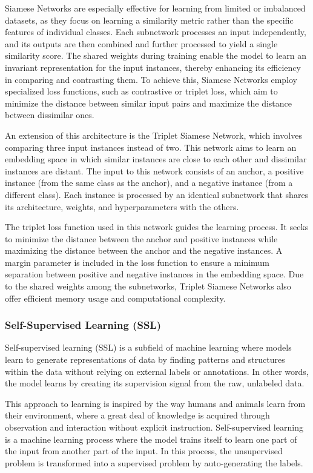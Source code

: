 Siamese Networks are especially effective for learning from limited or imbalanced datasets, as they focus on learning a similarity metric rather than the specific features of individual classes. Each subnetwork processes an input independently, and its outputs are then combined and further processed to yield a single similarity score. The shared weights during training enable the model to learn an invariant representation for the input instances, thereby enhancing its efficiency in comparing and contrasting them. To achieve this, Siamese Networks employ specialized loss functions, such as contrastive or triplet loss, which aim to minimize the distance between similar input pairs and maximize the distance between dissimilar ones.

An extension of this architecture is the Triplet Siamese Network, which involves comparing three input instances instead of two. This network aims to learn an embedding space in which similar instances are close to each other and dissimilar instances are distant. The input to this network consists of an anchor, a positive instance (from the same class as the anchor), and a negative instance (from a different class). Each instance is processed by an identical subnetwork that shares its architecture, weights, and hyperparameters with the others.

The triplet loss function used in this network guides the learning process. It seeks to minimize the distance between the anchor and positive instances while maximizing the distance between the anchor and the negative instances. A margin parameter is included in the loss function to ensure a minimum separation between positive and negative instances in the embedding space. Due to the shared weights among the subnetworks, Triplet Siamese Networks also offer efficient memory usage and computational complexity.

\subsubsection{Self-Supervised Learning (SSL)}

Self-supervised learning (SSL) is a subfield of machine learning where models learn to generate representations of data by finding patterns and structures within the data without relying on external labels or annotations. In other words, the model learns by creating its supervision signal from the raw, unlabeled data.\cite{audioselfsupsurvey}

This approach to learning is inspired by the way humans and animals learn from their environment, where a great deal of knowledge is acquired through observation and interaction without explicit instruction. Self-supervised learning is a machine learning process where the model trains itself to learn one part of the input from another part of the input. In this process, the unsupervised problem is transformed into a supervised problem by auto-generating the labels.

